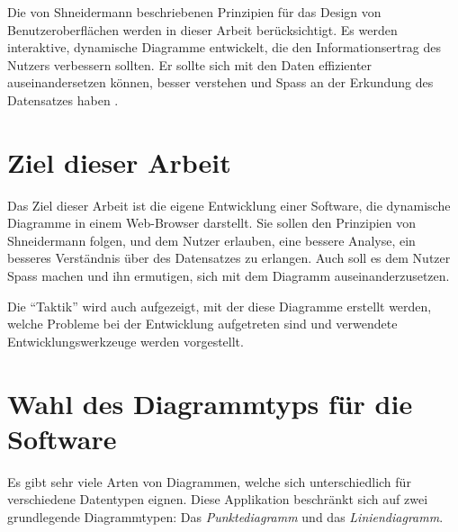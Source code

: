 Die von Shneidermann beschriebenen Prinzipien für das Design von Benutzeroberflächen werden in dieser Arbeit berücksichtigt. Es werden interaktive, dynamische Diagramme entwickelt, die den Informationsertrag des Nutzers verbessern sollten. Er sollte sich mit den Daten effizienter auseinandersetzen können, besser verstehen und Spass an der Erkundung des Datensatzes haben \cite{shneiderman}.

\section{Ziel dieser Arbeit}

Das Ziel dieser Arbeit ist die eigene Entwicklung einer Software, die dynamische Diagramme in einem Web-Browser darstellt. Sie sollen den Prinzipien von Shneidermann folgen, und dem Nutzer erlauben, eine bessere Analyse, ein besseres Verständnis über des Datensatzes zu erlangen. Auch soll es dem Nutzer Spass machen und ihn ermutigen, sich mit dem Diagramm auseinanderzusetzen.

Die "`Taktik"' wird auch aufgezeigt, mit der diese Diagramme erstellt werden, welche Probleme bei der Entwicklung aufgetreten sind und verwendete Entwicklungswerkzeuge werden vorgestellt.

\section{Wahl des Diagrammtyps für die Software}

Es gibt sehr viele Arten von Diagrammen, welche sich unterschiedlich für verschiedene Datentypen eignen. 
Diese Applikation beschränkt sich auf zwei grundlegende Diagrammtypen: Das \textit{Punktediagramm} und das \textit{Liniendiagramm}.


